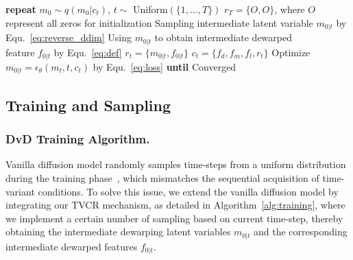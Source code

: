 \begin{algorithm}[tp]
	\flushleft
	\caption{DvD training for TVCR mechanism}
	\begin{algorithmic}[1] %
		\STATE  \textbf{repeat}
		\STATE  $m_0\sim q(m_0|c_t)$, $t \sim$ Uniform$(\{1,...,T\})$
        \STATE  $r_T=\{O,O\}$, where $O$ represent all zeros for initialization 
        \STATE  Sampling intermediate latent variable $m_{0|t}$ by Equ.~\ref{eq:reverse_ddim}
        \STATE  Using $m_{0|t}$ to obtain intermediate dewarped \\
                feature $f_{0|t}$ by Equ.~\ref{eq:def}
        \ENDFOR
        \STATE  $r_t=\{m_{0|t},f_{0|t}\}$
        \ENDIF
        \STATE $c_t=\{f_d,f_m,f_l,r_t\}$
		\STATE Optimize $m_{0|t}=\mathcal{\epsilon}_{\theta}(m_t, t, c_t)$ by Equ.~\ref{eq:loss}
		\STATE \textbf{until} Converged
	\end{algorithmic}
	\label{alg:training}
\end{algorithm}


\subsection{Training and Sampling}
\label{sec:method33}
\subsubsection{DvD Training Algorithm.}
Vanilla diffusion model randomly samples time-steps from a uniform distribution during the training phase~\cite{ho_2020_ddpm}, which mismatches the sequential acquisition of time-variant conditions. To solve this issue, we extend the vanilla diffusion model by integrating our TVCR mechanism, as detailed in Algorithm~\ref{alg:training}, where we implement a certain number of sampling based on current time-step, thereby obtaining the intermediate dewarping latent variables $m_{0|t}$ and the corresponding intermediate dewarped features $f_{0|t}$.





